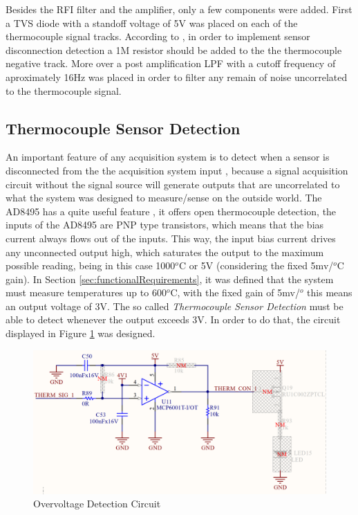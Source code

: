 	Besides the RFI filter and the amplifier, only a few components were added. First a TVS diode with a standoff voltage of 5V was placed on each of the thermocouple signal tracks. According to \cite{ad8495-datasheet}, in order to implement sensor disconnection detection a 1M resistor should be added to the the thermocouple negative track. More over a post amplification LPF with a cutoff frequency of aproximately 16Hz was placed in order to filter any remain of noise uncorrelated to the thermocouple signal.
		
	\subsection{Thermocouple Sensor Detection}\label{ssec:thermocouple-sensor-detection}
		
	An important feature of any acquisition system is to detect when a sensor is disconnected from the the acquisition system input \cite{o2011pressure}, because a signal acquisition circuit without the signal source will generate outputs that are uncorrelated to what the system was designed to measure/sense on the outside world. The AD8495 has a quite useful feature \cite{ad8495-datasheet}, it offers open thermocouple detection, the inputs of the AD8495 are PNP type transistors, which means that the bias current always flows out of the inputs. This way, the input bias current drives any unconnected output high, which saturates the output to the maximum possible reading, being in this case 1000$^{o}$C or 5V (considering the fixed 5mv/$^{o}$C gain). In Section \ref{sec:functionalRequirements}, it was defined that the system must measure temperatures up to 600$^{o}$C, with the fixed gain of 5mv/$^{o}$ this means an output voltage of 3V. The so called \textit{Thermocouple Sensor Detection} must be able to detect whenever the output exceeds 3V. In order to do that, the circuit displayed in Figure \ref{fig:overvoltage-sensor-detection} was designed.
	
		\begin{figure}[htbp]
			\centering
				\includegraphics[width=.8\textwidth]{figuras/fig-overvoltage-sensor-detection}
			\caption{Overvoltage Detection Circuit}
			\label{fig:overvoltage-sensor-detection}
		\end{figure}
		
